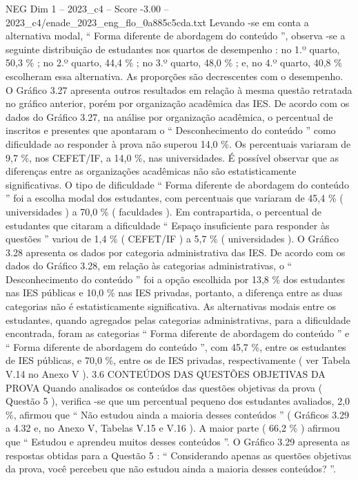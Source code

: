 \begin{textsample}{NEG Dim 1 – 2023\_c4 – Score -3.00 – 2023\_c4/enade\_2023\_eng\_flo\_0a885c5cda.txt}
Levando -se em conta a alternativa modal, “ Forma diferente de abordagem do conteúdo ”, observa -se a seguinte distribuição de estudantes nos quartos de desempenho : no 1.º quarto, 50,3 \% ; no 2.º quarto, 44,4 \% ; no 3.º quarto, 48,0 \% ; e, no 4.º quarto, 40,8 \% escolheram essa alternativa.
As proporções são decrescentes com o desempenho.
O Gráfico 3.27 apresenta outros resultados em relação à mesma questão retratada no gráfico anterior, porém por organização acadêmica das IES.
De acordo com os dados do Gráfico 3.27, na análise por organização acadêmica, o percentual de inscritos e presentes que apontaram o “ Desconhecimento do conteúdo ” como dificuldade ao responder à prova não superou 14,0 \%.
Os percentuais variaram de 9,7 \%, nos CEFET/IF, a 14,0 \%, nas universidades.
É possível observar que as diferenças entre as organizações acadêmicas não são estatisticamente significativas.
O tipo de dificuldade “ Forma diferente de abordagem do conteúdo ” foi a escolha modal dos estudantes, com percentuais que variaram de 45,4 \% ( universidades ) a 70,0 \% ( faculdades ).
Em contrapartida, o percentual de estudantes que citaram a dificuldade “ Espaço insuficiente para responder às questões ” variou de 1,4 \% ( CEFET/IF ) a 5,7 \% ( universidades ).
O Gráfico 3.28 apresenta os dados por categoria administrativa das IES.
De acordo com os dados do Gráfico 3.28, em relação às categorias administrativas, o “ Desconhecimento do conteúdo ” foi a opção escolhida por 13,8 \% dos estudantes nas IES públicas e 10,0 \% nas IES privadas, portanto, a diferença entre as duas categorias não é estatisticamente significativa.
As alternativas modais entre os estudantes, quando agregados pelas categorias administrativas, para a dificuldade encontrada, foram as categorias “ Forma diferente de abordagem do conteúdo ” e “ Forma diferente de abordagem do conteúdo ”, com 45,7 \%, entre os estudantes de IES públicas, e 70,0 \%, entre os de IES privadas, respectivamente ( ver Tabela V.14 no Anexo V ). 3.6 CONTEÚDOS DAS QUESTÕES OBJETIVAS DA PROVA Quando analisados os conteúdos das questões objetivas da prova ( Questão 5 ), verifica -se que um percentual pequeno dos estudantes avaliados, 2,0 \%, afirmou que “ Não estudou ainda a maioria desses conteúdos ” ( Gráficos 3.29 a 4.32 e, no Anexo V, Tabelas V.15 e V.16 ).
A maior parte ( 66,2 \% ) afirmou que “ Estudou e aprendeu muitos desses conteúdos ”.
O Gráfico 3.29 apresenta as respostas obtidas para a Questão 5 : “ Considerando apenas as questões objetivas da prova, você percebeu que não estudou ainda a maioria desses conteúdos? ”.

\end{textsample}
